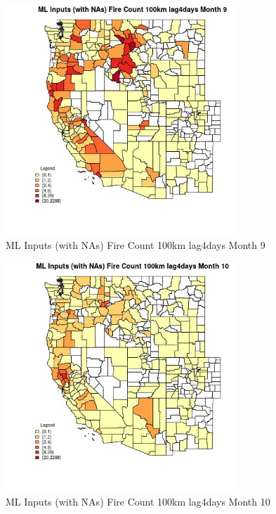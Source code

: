 \begin{figure} 
\centering  
\includegraphics[width=0.77\textwidth]{Code_Outputs/Report_ML_input_PM25_Step4_part_e_de_duplicated_aves_compiled_2019-05-20wNAs_CountyFire_Count_100km_lag4daysmedianMonth9.jpg} 
\caption{\label{fig:Report_ML_input_PM25_Step4_part_e_de_duplicated_aves_compiled_2019-05-20wNAsCountyFire_Count_100km_lag4daysmedianMonth9}ML Inputs (with NAs) Fire Count 100km lag4days Month 9} 
\end{figure} 
 

\begin{figure} 
\centering  
\includegraphics[width=0.77\textwidth]{Code_Outputs/Report_ML_input_PM25_Step4_part_e_de_duplicated_aves_compiled_2019-05-20wNAs_CountyFire_Count_100km_lag4daysmedianMonth10.jpg} 
\caption{\label{fig:Report_ML_input_PM25_Step4_part_e_de_duplicated_aves_compiled_2019-05-20wNAsCountyFire_Count_100km_lag4daysmedianMonth10}ML Inputs (with NAs) Fire Count 100km lag4days Month 10} 
\end{figure} 
 

